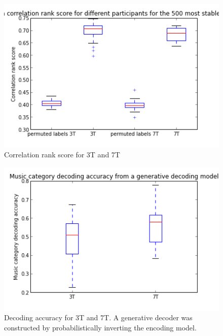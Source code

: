 \begin{figure}
  \centering
  \includegraphics[width=\linewidth]{pics/correlation_rank_score}
  \caption{Correlation rank score for 3T and 7T}
  \label{fig:rankscore}
\end{figure}

\begin{figure}
  \centering
  \includegraphics[width=\linewidth]{pics/decoding_accuracy}
  \caption{Decoding accuracy for 3T and 7T. A generative decoder was constructed by probabilistically inverting the encoding model.}
  \label{fig:decoder}
\end{figure}


